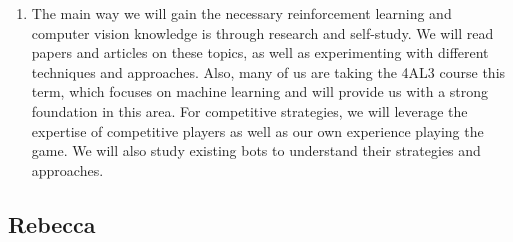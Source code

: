\documentclass{article}
\begin{document}
\begin{enumerate}
    \item The main way we will gain the necessary reinforcement learning and computer vision
    knowledge is through research and self-study. We will read papers and articles on these topics,
    as well as experimenting with different techniques and approaches. Also, many of us are taking
    the 4AL3 course this term, which focuses on machine learning and will provide us with a strong
    foundation in this area. For competitive \emph{\Catan{}} strategies, we will leverage the expertise of
    competitive players as well as our own experience playing the game. We will also study existing \emph{\Catan{}} bots
    to understand their strategies and approaches.

\end{enumerate}

\subsection*{Rebecca}\label{subsec:rebecca}
\end{document}
